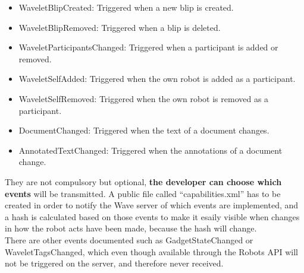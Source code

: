 \begin{itemize}
  \item WaveletBlipCreated: Triggered when a new blip is created.
  \item WaveletBlipRemoved: Triggered when a blip is deleted.
  \item WaveletParticipantsChanged: Triggered when a participant is added or removed.
  \item WaveletSelfAdded: Triggered when the own robot is added as a participant.
  \item WaveletSelfRemoved: Triggered when the own robot is removed as a participant.
  \item DocumentChanged: Triggered when the text of a document changes.
  \item AnnotatedTextChanged: Triggered when the annotations of a document change.
\end{itemize}
They are not compulsory but optional, \textbf{the developer can choose which events} will be transmitted. A public file called ``capabilities.xml'' has to be created in order to notify the Wave server of which events are implemented, and a hash is calculated based on those events to make it esaily visible when changes in how the robot acts have been made, because the hash will change.\\[.2cm]
There are other events documented such as GadgetStateChanged or WaveletTagsChanged, which even though available through the Robots API will not be triggered on the server, and therefore never received.
